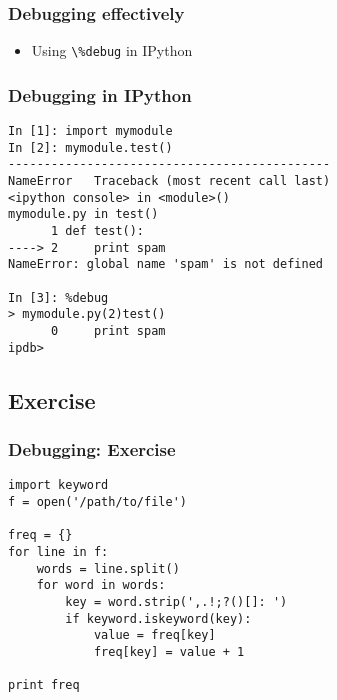 \documentclass[compress,14pt]{beamer}
\newcommand{\typ}[1]{\lstinline{#1}}
\newcounter{time}
\newcommand{\inctime}[1]{\addtocounter{time}{#1}{\vspace*{0.1in}\tiny \thetime\ m}}
\begin{document}
\begin{frame}[fragile]
    \frametitle{Debugging effectively}
    \begin{itemize}
      \item Using \typ{\%debug} in IPython
    \end{itemize}
\end{frame}

\begin{frame}[fragile]
\frametitle{Debugging in IPython}
\small
\begin{lstlisting}
In [1]: import mymodule
In [2]: mymodule.test()
---------------------------------------------
NameError   Traceback (most recent call last)
<ipython console> in <module>()
mymodule.py in test()
      1 def test():
----> 2     print spam
NameError: global name 'spam' is not defined

In [3]: %debug
> mymodule.py(2)test()
      0     print spam
ipdb> 
\end{lstlisting}
\inctime{15} 
\end{frame}

\subsection{Exercise}
\begin{frame}[fragile]
\frametitle{Debugging: Exercise}
\small
\begin{lstlisting}
import keyword
f = open('/path/to/file')

freq = {}
for line in f:
    words = line.split()
    for word in words:
        key = word.strip(',.!;?()[]: ')
        if keyword.iskeyword(key):
            value = freq[key]
            freq[key] = value + 1

print freq
\end{lstlisting}
\inctime{10}
\end{frame}

   


\end{document}
